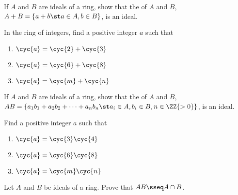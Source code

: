 \documentclass{article}
\begin{document}
\begin{solution} %
\end{solution}

If \( A \) and \( B \) are ideals of a ring, show that the  of \( A \) and \( B \), \( A+B = \{a+b\st a\in A,b\in B\} \), is an ideal.

\begin{solution} %
\end{solution}


In the ring of integers, find a positive integer \( a \) such that
\begin{enumerate}[label=\bd{\alph*.}]
  \item \( \cyc{a} = \cyc{2} + \cyc{3} \)
  \item \( \cyc{a} = \cyc{6} + \cyc{8} \)
  \item \( \cyc{a} = \cyc{m} + \cyc{n} \)
\end{enumerate}

\begin{solution} %
\end{solution}

If \( A \) and \( B \) are ideals of a ring, show that the  of \( A \) and \( B \), \( AB = \{a_1b_1 + a_2b_2 + \cdots + a_nb_n \st a_i\in A, b_i\in B, n \in\ZZ{>0}\} \), is an ideal.

\begin{solution} %
\end{solution}

Find a positive integer \( a \) such that
\begin{enumerate}
  \item \( \cyc{a} = \cyc{3}\cyc{4} \)
  \item \( \cyc{a} = \cyc{6}\cyc{8} \)
  \item \( \cyc{a} = \cyc{m}\cyc{n} \)
\end{enumerate}

\begin{solution} %
\end{solution}

Let \( A \) and \( B \) be ideals of a ring. Prove that \( AB\sseq A\cap B \).

\begin{solution} %
\end{solution}
\end{document}
